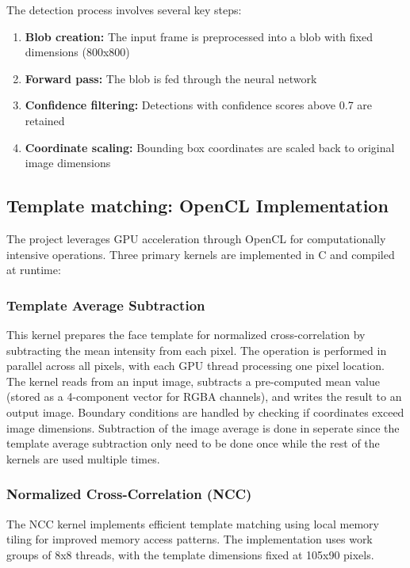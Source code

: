 \documentclass[12pt]{article}
\begin{document}
The detection process involves several key steps:

\begin{enumerate}
    \item \textbf{Blob creation:} The input frame is preprocessed into a blob with fixed dimensions (800x800)
    \item \textbf{Forward pass:} The blob is fed through the neural network
    \item \textbf{Confidence filtering:} Detections with confidence scores above 0.7 are retained
    \item \textbf{Coordinate scaling:} Bounding box coordinates are scaled back to original image dimensions
\end{enumerate}

\subsection{Template matching: OpenCL Implementation} \label{subsec:Template matching: OpenCL Implementation}

The project leverages GPU acceleration through OpenCL for computationally
intensive operations. Three primary kernels are implemented in C and compiled
at runtime:

\subsubsection{Template Average Subtraction}

This kernel prepares the face template for normalized cross-correlation by
subtracting the mean intensity from each pixel. The operation is performed in
parallel across all pixels, with each GPU thread processing one pixel location.
The kernel reads from an input image, subtracts a pre-computed mean value
(stored as a 4-component vector for RGBA channels), and writes the result to an
output image. Boundary conditions are handled by checking if coordinates exceed
image dimensions. Subtraction of the image average is done in seperate since
the template average subtraction only need to be done once while the rest of
the kernels are used multiple times.

\subsubsection{Normalized Cross-Correlation (NCC)}

The NCC kernel implements efficient template matching using local memory tiling
for improved memory access patterns. The implementation uses work groups of 8x8
threads, with the template dimensions fixed at 105x90 pixels.
\end{document}
